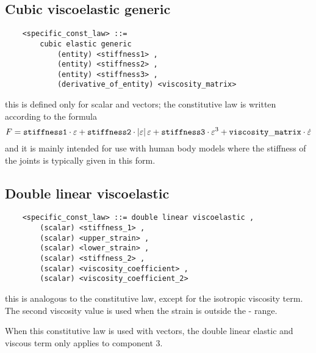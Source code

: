 \subsection{Cubic viscoelastic generic}
\begin{verbatim}
    <specific_const_law> ::= 
        cubic elastic generic
            (entity) <stiffness1> ,
            (entity) <stiffness2> ,
            (entity) <stiffness3> ,
            (derivative_of_entity) <viscosity_matrix> 
\end{verbatim}
this is defined only for scalar and  vectors; the constitutive
law is written according to the formula
\begin{displaymath}
	F = \mathtt{stiffness1} \cdot \varepsilon
	+ \mathtt{stiffness2} \cdot \left| \varepsilon \right|\varepsilon
	+ \mathtt{stiffness3} \cdot \varepsilon^3
	+ \mathtt{viscosity\_matrix} \cdot \dot{\varepsilon}
\end{displaymath}
and it is mainly intended for use with human body models 
where the stiffness of the joints is typically given in this form.

\subsection{Double linear viscoelastic}
\begin{verbatim}
    <specific_const_law> ::= double linear viscoelastic ,
        (scalar) <stiffness_1> ,
        (scalar) <upper_strain> ,
        (scalar) <lower_strain> ,
        (scalar) <stiffness_2> ,
        (scalar) <viscosity_coefficient> ,
        (scalar) <viscosity_coefficient_2>
\end{verbatim}
this is analogous to the  constitutive law,
except for the isotropic viscosity term.
The second viscosity value is used when the strain is outside the
- range.

When this constitutive law is used with  vectors, 
the double linear elastic and viscous term only applies to component 3.
  
